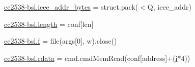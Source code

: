\begin{DoxyCompactItemize}
\item 
\hyperlink{namespacecc2538-bsl_a9a0abbd5726392bcc9c042a78435094e}{cc2538-\/bsl.\+ieee\+\_\+addr\+\_\+bytes} = struct.\+pack(\textquotesingle{}$<$Q\textquotesingle{}, ieee\+\_\+addr)
\item 
\hyperlink{namespacecc2538-bsl_a805cc7085603640390bef3787085a8aa}{cc2538-\/bsl.\+length} = conf\mbox{[}\textquotesingle{}len\textquotesingle{}\mbox{]}
\item 
\hyperlink{namespacecc2538-bsl_a8f64920fa83dd3645670a989c153360b}{cc2538-\/bsl.\+f} = file(args\mbox{[}0\mbox{]}, \textquotesingle{}w\textquotesingle{}).close()
\item 
\hyperlink{namespacecc2538-bsl_a7c79c1799d75b3d51f698d907fd7a34a}{cc2538-\/bsl.\+rdata} = cmd.\+cmd\+Mem\+Read(conf\mbox{[}\textquotesingle{}address\textquotesingle{}\mbox{]}+(\hyperlink{pmc_8c_acb559820d9ca11295b4500f179ef6392}{i}$\ast$4))
\end{DoxyCompactItemize}
